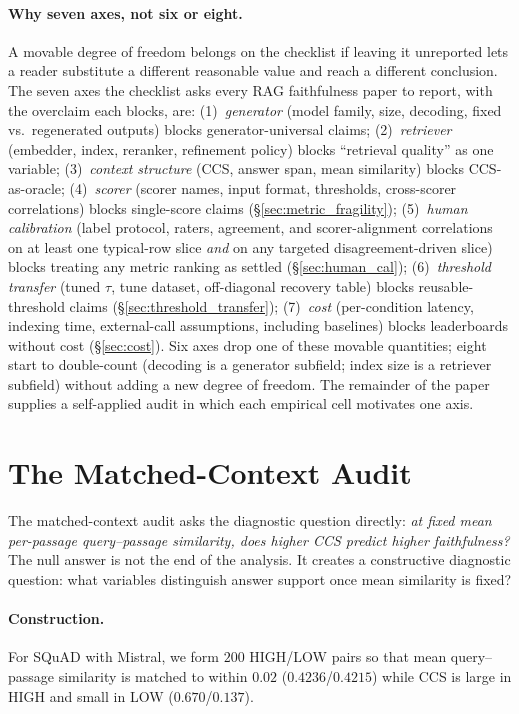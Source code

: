 \paragraph{Why seven axes, not six or eight.} A movable degree of
freedom belongs on the checklist if leaving it unreported lets a
reader substitute a different reasonable value and reach a different
conclusion. The seven axes the checklist asks every RAG faithfulness
paper to report, with the overclaim each blocks, are:
(1)~\emph{generator} (model family, size, decoding, fixed vs.\
regenerated outputs) blocks generator-universal claims; (2)~\emph{retriever}
(embedder, index, reranker, refinement policy) blocks ``retrieval
quality'' as one variable; (3)~\emph{context structure} (CCS, answer
span, mean similarity) blocks CCS-as-oracle; (4)~\emph{scorer}
(scorer names, input format, thresholds, cross-scorer correlations)
blocks single-score claims (\S\ref{sec:metric_fragility});
(5)~\emph{human calibration} (label protocol, raters, agreement, and
scorer-alignment correlations on at least one typical-row slice
\emph{and} on any targeted disagreement-driven slice) blocks
treating any metric ranking as settled (\S\ref{sec:human_cal});
(6)~\emph{threshold transfer} (tuned $\tau$, tune dataset,
off-diagonal recovery table) blocks reusable-threshold claims
(\S\ref{sec:threshold_transfer}); (7)~\emph{cost} (per-condition
latency, indexing time, external-call assumptions, including
baselines) blocks leaderboards without cost (\S\ref{sec:cost}). Six
axes drop one of these movable quantities; eight start to
double-count (decoding is a generator subfield; index size is a
retriever subfield) without adding a new degree of freedom. The
remainder of the paper supplies a self-applied audit in which each
empirical cell motivates one axis.

\section{The Matched-Context Audit}
\label{sec:matched_ccs}

The matched-context audit asks the diagnostic question directly:
\emph{at fixed mean per-passage query--passage similarity, does higher
CCS predict higher faithfulness?} The null answer is not the end of the
analysis. It creates a constructive diagnostic question: what variables
distinguish answer support once mean similarity is fixed?

\paragraph{Construction.} For SQuAD with Mistral, we form $200$
HIGH/LOW pairs so that mean query--passage similarity is matched to
within $0.02$ ($0.4236$/$0.4215$) while CCS is large in HIGH and small
in LOW ($0.670$/$0.137$).

